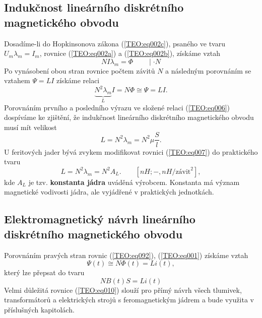     \subsection{Indukčnost lineárního diskrétního magnetického obvodu}
      Dosadíme-li do Hopkinsonova zákona (\ref{TEO:eq002c}), psaného ve tvaru \(U_m\lambda_m=I_m\), 
      rovnice (\ref{TEO:eq002a}) a (\ref{TEO:eq002b}), získáme vztah
      \begin{equation}  \label{TEO:eq005}
        NI\lambda_m = \Phi\qquad\mid \cdot N
      \end{equation}
      Po vynásobení obou stran rovnice počtem závitů \(N\) a následným porovnáním se vztahem \(\Psi 
      = LI\) získáme relaci
      \begin{equation}  \label{TEO:eq006}
        \underbrace{N^2\lambda_m}_L I = N\Phi \cong\Psi = LI.
      \end{equation}
      Porovnáním prvního a posledního výrazu ve složené relaci (\ref{TEO:eq006}) dospíváme ke 
      zjištění, že indukčnost lineárního diskrétního magnetického obvodu musí mít velikost
      \begin{equation}  \label{TEO:eq007}
        \boxed{L = N^2\lambda_m = N^2\mu\frac{S}{l}.}
      \end{equation}
      U feritových jader bývá zvykem modifikovat rovnici (\ref{TEO:eq007}) do praktického tvaru 
      \begin{equation}  \label{TEO:eq008}
        \boxed{L = N^2\lambda_m = N^2A_L.} \qquad [nH; -, nH/\text{závit}^2],
      \end{equation}
      kde \(A_L\) je tzv. \textbf{konstanta jádra} uváděná výrobcem. Konstanta má význam magnetické 
      vodivosti jádra, ale vyjádřené v praktických jednotkách.

    \subsection{Elektromagnetický návrh lineárního diskrétního magnetického obvodu}
       Porovnáním pravých stran rovnic (\ref{TEO:eq092}), (\ref{TEO:eq001}) získáme vztah
      \begin{equation}  \label{TEO:eq009}
        \Psi(t) \cong N\Phi(t) = Li(t),
      \end{equation}
      který lze přepsat do tvaru
      \begin{equation}  \label{TEO:eq010}
        \boxed{NB(t)S = Li(t)}
      \end{equation}
      Velmi důležitá rovnice (\ref{TEO:eq010}) slouží pro přímý návrh všech tlumivek, 
      transformátorů a elektrických strojů s feromagnetickým jádrem a bude využita v příslušných 
      kapitolách.
      
